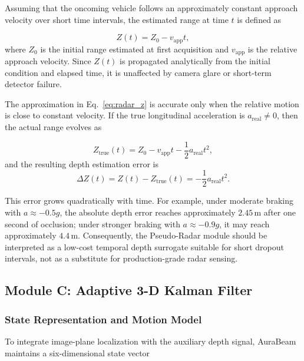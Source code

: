 \documentclass[pdflatex,sn-mathphys-num]{sn-jnl}%
\theoremstyle{thmstyleone}%
\theoremstyle{thmstyletwo}%
\theoremstyle{thmstylethree}%
\begin{document}
Assuming that the oncoming vehicle follows an approximately constant approach velocity over short time intervals, the estimated range at time $t$ is defined as

\begin{equation}
Z(t) = Z_0 - v_{\mathrm{app}} t,
\label{eq:radar_z}
\end{equation}
where $Z_0$ is the initial range estimated at first acquisition and $v_{\mathrm{app}}$ is the relative approach velocity. Since $Z(t)$ is propagated analytically from the initial condition and elapsed time, it is unaffected by camera glare or short-term detector failure.

The approximation in Eq.~\eqref{eq:radar_z} is accurate only when the relative motion is close to constant velocity. If the true longitudinal acceleration is $a_{\mathrm{real}} \neq 0$, then the actual range evolves as

\begin{equation}
Z_{\mathrm{true}}(t) = Z_0 - v_{\mathrm{app}} t - \frac{1}{2} a_{\mathrm{real}} t^2,
\label{eq:radar_true}
\end{equation}
and the resulting depth estimation error is
\begin{equation}
\Delta Z(t) = Z(t) - Z_{\mathrm{true}}(t) = -\frac{1}{2} a_{\mathrm{real}} t^2.
\label{eq:depth_error}
\end{equation}

This error grows quadratically with time. For example, under moderate braking with $a \approx -0.5g$, the absolute depth error reaches approximately $2.45$\,m after one second of occlusion; under stronger braking with $a \approx -0.9g$, it may reach approximately $4.4$\,m. Consequently, the Pseudo-Radar module should be interpreted as a low-cost temporal depth surrogate suitable for short dropout intervals, not as a substitute for production-grade radar sensing.

\subsection{Module C: Adaptive 3-D Kalman Filter}
\label{subsec:kf_fusion}

\subsubsection{State Representation and Motion Model}

To integrate image-plane localization with the auxiliary depth signal, AuraBeam maintains a six-dimensional state vector
\end{document}
